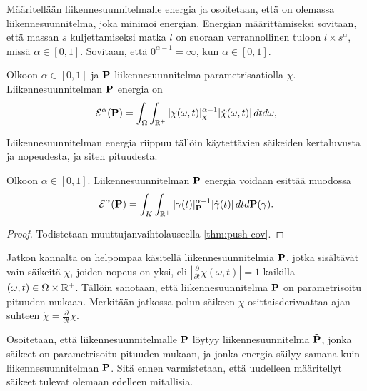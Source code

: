 \documentclass[12pt,oneside,a4paper]{amsbook} %
\begin{document}
Määritellään liikennesuunnitelmalle energia ja osoitetaan, että on olemassa liikennesuunnitelma, joka minimoi energian. Energian määrittämiseksi sovitaan, että massan $s$ kuljettamiseksi matka $l$ on suoraan verrannollinen tuloon $l \times s^\alpha$, missä $\alpha \in [0, 1]$. Sovitaan, että $0^{\alpha - 1} = \infty$, kun $\alpha \in [0, 1]$. 

\begin{definition}\label{def:energyOfP}
    Olkoon $\alpha \in [0, 1]$ ja $\P$ liikennesuunnitelma parametrisaatiolla $\chi$. Liikennesuunnitelman $\P$ energia on 
        \begin{equation*}
            \E^\alpha(\P) = \int_\Omega \int_{\R^+} |\chi(\omega, t)|_\chi^{\alpha-1}|\dot \chi(\omega, t)|\, dtd\omega,
        \end{equation*}
\end{definition}

Liikennesuunnitelman energia riippuu tällöin käytettävien säikeiden kertaluvusta ja nopeudesta, ja siten pituudesta.

\begin{remark}\label{thm:energyOfPIndependent}
    Olkoon $\alpha \in [0, 1].$ Liikennesuunnitelman $\P$ energia voidaan esittää muodossa
    \begin{equation*}
        \E^\alpha(\P) = \int_K \int_{\R^+}|\gamma(t)|^{\alpha-1}_\P|\dot\gamma(t)| \, dtd\P(\gamma).
    \end{equation*}
\end{remark}
\begin{proof}
    Todistetaan muuttujanvaihtolauseella \ref{thm:push-cov}.
\end{proof}

Jatkon kannalta on helpompaa käsitellä liikennesuunnitelmia $\P$, jotka sisältävät vain säikeitä $\chi$, joiden nopeus on yksi, eli $|\frac{\partial}{\partial t}\chi(\omega, t)| = 1$ kaikilla $(\omega, t) \in \Omega \times \Rp$. Tällöin sanotaan, että liikennesuunnitelma $\P$ on parametrisoitu pituuden mukaan. Merkitään jatkossa polun säikeen $\chi$ osittaisderivaattaa ajan suhteen $\dot \chi = \frac{\partial}{\partial t}\chi$. 

Osoitetaan, että liikennesuunnitelmalle $\P$ löytyy liikennesuunnitelma $\tilde \P$, jonka säikeet on parametrisoitu pituuden mukaan, ja jonka energia säilyy samana kuin liikennesuunnitelman $\P$. Sitä ennen varmistetaan, että uudelleen määritellyt säikeet tulevat olemaan edelleen mitallisia.
\end{document}
